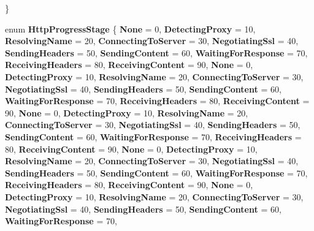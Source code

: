 \begin{DoxyCompactItemize}
 \}
\item 
\mbox{\label{namespace_windows_1_1_web_1_1_http_aa0f55350f3367ec69564a41407e44b3b}} 
enum {\bfseries Http\+Progress\+Stage} \{ \newline
{\bfseries None} = 0, 
{\bfseries Detecting\+Proxy} = 10, 
{\bfseries Resolving\+Name} = 20, 
{\bfseries Connecting\+To\+Server} = 30, 
\newline
{\bfseries Negotiating\+Ssl} = 40, 
{\bfseries Sending\+Headers} = 50, 
{\bfseries Sending\+Content} = 60, 
{\bfseries Waiting\+For\+Response} = 70, 
\newline
{\bfseries Receiving\+Headers} = 80, 
{\bfseries Receiving\+Content} = 90, 
{\bfseries None} = 0, 
{\bfseries Detecting\+Proxy} = 10, 
\newline
{\bfseries Resolving\+Name} = 20, 
{\bfseries Connecting\+To\+Server} = 30, 
{\bfseries Negotiating\+Ssl} = 40, 
{\bfseries Sending\+Headers} = 50, 
\newline
{\bfseries Sending\+Content} = 60, 
{\bfseries Waiting\+For\+Response} = 70, 
{\bfseries Receiving\+Headers} = 80, 
{\bfseries Receiving\+Content} = 90, 
\newline
{\bfseries None} = 0, 
{\bfseries Detecting\+Proxy} = 10, 
{\bfseries Resolving\+Name} = 20, 
{\bfseries Connecting\+To\+Server} = 30, 
\newline
{\bfseries Negotiating\+Ssl} = 40, 
{\bfseries Sending\+Headers} = 50, 
{\bfseries Sending\+Content} = 60, 
{\bfseries Waiting\+For\+Response} = 70, 
\newline
{\bfseries Receiving\+Headers} = 80, 
{\bfseries Receiving\+Content} = 90, 
{\bfseries None} = 0, 
{\bfseries Detecting\+Proxy} = 10, 
\newline
{\bfseries Resolving\+Name} = 20, 
{\bfseries Connecting\+To\+Server} = 30, 
{\bfseries Negotiating\+Ssl} = 40, 
{\bfseries Sending\+Headers} = 50, 
\newline
{\bfseries Sending\+Content} = 60, 
{\bfseries Waiting\+For\+Response} = 70, 
{\bfseries Receiving\+Headers} = 80, 
{\bfseries Receiving\+Content} = 90, 
\newline
{\bfseries None} = 0, 
{\bfseries Detecting\+Proxy} = 10, 
{\bfseries Resolving\+Name} = 20, 
{\bfseries Connecting\+To\+Server} = 30, 
\newline
{\bfseries Negotiating\+Ssl} = 40, 
{\bfseries Sending\+Headers} = 50, 
{\bfseries Sending\+Content} = 60, 
{\bfseries Waiting\+For\+Response} = 70, 
\newline

\end{DoxyCompactItemize}
